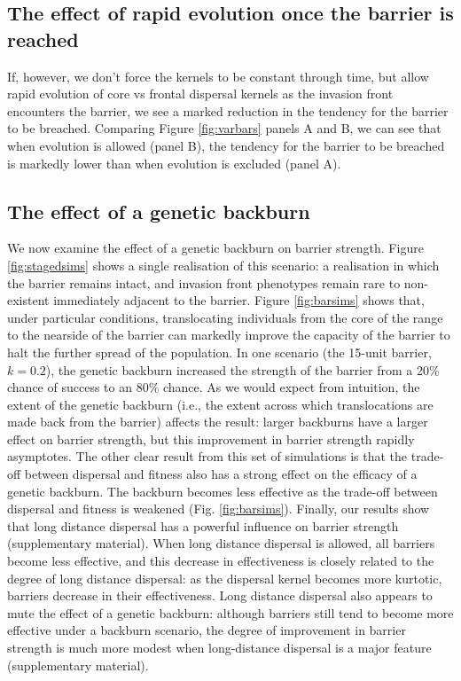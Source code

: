\documentclass{article}
\begin{document}
\subsection{The effect of rapid evolution once the barrier is reached}

If, however, we don't force the kernels to be constant through time, but allow rapid evolution of core vs frontal dispersal kernels as the invasion front encounters the barrier, we see a marked reduction in the tendency for the barrier to be breached. Comparing Figure \ref{fig:varbars} panels A and B, we can see that when evolution is allowed (panel B), the tendency for the barrier to be breached is markedly lower than when evolution is excluded (panel A).

\subsection{The effect of a genetic backburn}
We now examine the effect of a genetic backburn on barrier strength.  Figure \ref{fig:stagedsims} shows a single realisation of this scenario: a realisation in which the barrier remains intact, and invasion front phenotypes remain rare to non-existent immediately adjacent to the barrier.  Figure \ref{fig:barsims} shows that, under particular conditions, translocating individuals from the core of the range to the nearside of the barrier can markedly improve the capacity of the barrier to halt the further spread of the population. In one scenario (the 15-unit barrier, $k=0.2$), the genetic backburn increased the strength of the barrier from a 20\% chance of success to an 80\% chance.  As we would expect from intuition, the extent of the genetic backburn (i.e., the extent across which translocations are made back from the barrier) affects the result: larger backburns have a larger effect on barrier strength, but this improvement in barrier strength rapidly asymptotes.  The other clear result from this set of simulations is that the trade-off between dispersal and fitness also has a strong effect on the efficacy of a genetic backburn.  The backburn becomes less effective as the trade-off between dispersal and fitness is weakened (Fig. \ref{fig:barsims}).  Finally, our results show that long distance dispersal has a powerful influence on barrier strength (supplementary material).  When long distance dispersal is allowed, all barriers become less effective, and this decrease in effectiveness is closely related to the degree of long distance dispersal: as the dispersal kernel becomes more kurtotic, barriers decrease in their effectiveness.  Long distance dispersal also appears to mute the effect of a genetic backburn: although barriers still tend to become more effective under a backburn scenario, the degree of improvement in barrier strength is much more modest when long-distance dispersal is a major feature (supplementary material).
\end{document}
